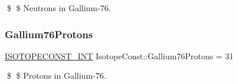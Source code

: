 \$ \$ Neutrons in Gallium-\/76. \mbox{\label{group___isotope_const-_gallium-_ga76_gac8b89fdc0e5fcb79b0c1fc4dd824f8c0}} 
\subsubsection{\texorpdfstring{Gallium76\+Protons}{Gallium76Protons}}
{\footnotesize\ttfamily \mbox{\hyperlink{group___isotope_const-_macros_ga5f18360b3e99483a35c32d789e62621c}{I\+S\+O\+T\+O\+P\+E\+C\+O\+N\+S\+T\+\_\+\+I\+NT}} Isotope\+Const\+::\+Gallium76\+Protons = 31}

\$ \$ Protons in Gallium-\/76. 